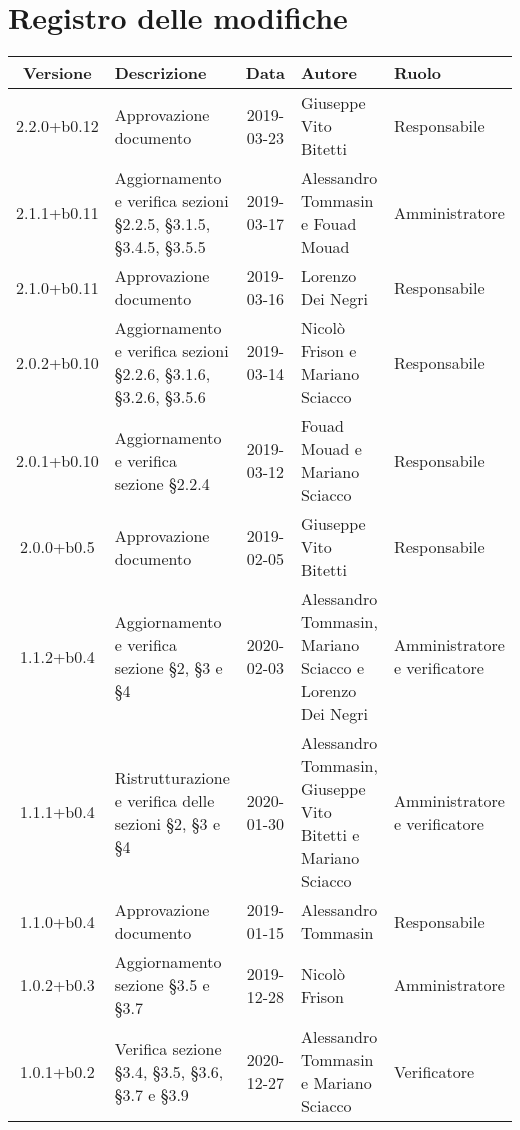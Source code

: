 \section*{Registro delle modifiche}

\begin{center}
	\begin{longtable}{|c|p{3.5cm}|c|p{3cm}|p{3cm}|}
	\hline
	\rowcolor{lighter-grayer}
	\textbf{Versione} & \textbf{Descrizione} & \textbf{Data} & \textbf{Autore} & \textbf{Ruolo} \\
	\hline
	\endfirsthead

	
	2.2.0+b0.12 & Approvazione documento & 2019-03-23 & Giuseppe Vito Bitetti & Responsabile \\
	\hline
	2.1.1+b0.11 & Aggiornamento e verifica sezioni \S2.2.5, \S3.1.5, \S3.4.5, \S3.5.5 & 2019-03-17 & Alessandro Tommasin e Fouad Mouad & Amministratore \\
	\hline
	2.1.0+b0.11 & Approvazione documento & 2019-03-16 & Lorenzo Dei Negri & Responsabile \\
	\hline
	2.0.2+b0.10 & Aggiornamento e verifica sezioni \S2.2.6, \S3.1.6, \S3.2.6, \S3.5.6 & 2019-03-14 & Nicolò Frison e Mariano Sciacco & Responsabile \\
	\hline
	2.0.1+b0.10 & Aggiornamento e verifica sezione \S2.2.4 & 2019-03-12 & Fouad Mouad e Mariano Sciacco & Responsabile \\
	\hline
	2.0.0+b0.5 & Approvazione documento & 2019-02-05 & Giuseppe Vito Bitetti & Responsabile \\
	\hline
	1.1.2+b0.4 & Aggiornamento e verifica sezione \S2, \S3 e \S4 & 2020-02-03 & Alessandro Tommasin, Mariano Sciacco e Lorenzo Dei Negri & Amministratore e verificatore \\
	\hline
	1.1.1+b0.4 & Ristrutturazione e verifica delle sezioni \S2, \S3 e \S4 & 2020-01-30 & Alessandro Tommasin, Giuseppe Vito Bitetti e Mariano Sciacco & Amministratore e verificatore \\
	\hline
	1.1.0+b0.4 & Approvazione documento & 2019-01-15 & Alessandro Tommasin & Responsabile \\
	\hline
	1.0.2+b0.3 & Aggiornamento sezione \S3.5 e \S3.7 & 2019-12-28 & Nicolò Frison & Amministratore \\
	\hline
	1.0.1+b0.2 & Verifica sezione \S3.4, \S3.5, \S3.6, \S3.7 e \S3.9 & 2020-12-27 & Alessandro Tommasin e Mariano Sciacco & Verificatore\\

\end{longtable}
\end{center}
